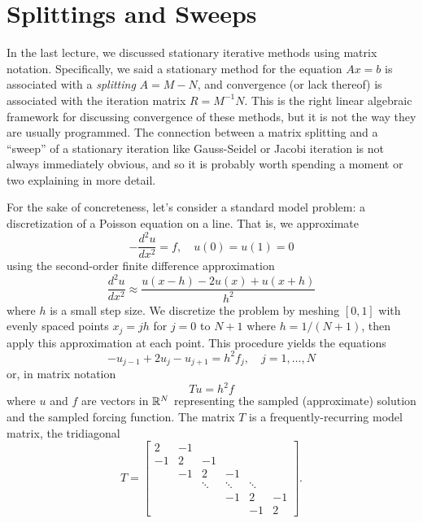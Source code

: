 \documentclass[12pt, leqno]{article}
\begin{document}

\section*{Splittings and Sweeps}

In the last lecture, we discussed stationary iterative methods using
matrix notation.  Specifically, we said a stationary method for
the equation $Ax = b$ is associated with a {\em splitting} $A = M-N$,
and convergence (or lack thereof) is associated with the iteration
matrix $R = M^{-1} N$.  This is the right linear algebraic framework
for discussing convergence of these methods, but it is not the way
they are usually programmed.  The connection between a matrix
splitting and a ``sweep'' of a stationary iteration like Gauss-Seidel
or Jacobi iteration is not always immediately obvious, and so it is
probably worth spending a moment or two explaining in more detail.

For the sake of concreteness, let's consider a standard model problem:
a discretization of a Poisson equation on a line.  That is, we
approximate
\[
  -\frac{d^2 u}{dx^2} = f, \quad u(0) = u(1) = 0
\]
using the second-order finite difference approximation
\[
  \frac{d^2 u}{dx^2} \approx \frac{u(x-h)-2u(x)+u(x+h)}{h^2}
\]
where $h$ is a small step size.  We discretize the problem by meshing
$[0,1]$ with evenly spaced points $x_j = jh$ for $j = 0$
to $N+1$ where $h = 1/(N+1)$, then apply this approximation at each
point.  This procedure yields the equations
\[
  -u_{j-1}+2u_j-u_{j+1} = h^2 f_j, \quad j = 1, \ldots, N
\]
or, in matrix notation
\[
  Tu = h^2 f
\]
where $u$ and $f$ are vectors in $\mathbb{R}^N$ representing the sampled
(approximate) solution and the sampled forcing function.  The matrix
$T$ is a frequently-recurring model matrix, the tridiagonal
\[
T =
\begin{bmatrix}
   2 & -1 \\
  -1 &  2 & -1 \\
     & -1 &  2 & -1 \\
     &    & \ddots & \ddots & \ddots \\
     &    &        & -1 & 2 & -1 \\
     &    &        &    & -1 & 2
\end{bmatrix}.
\]
\end{document}
